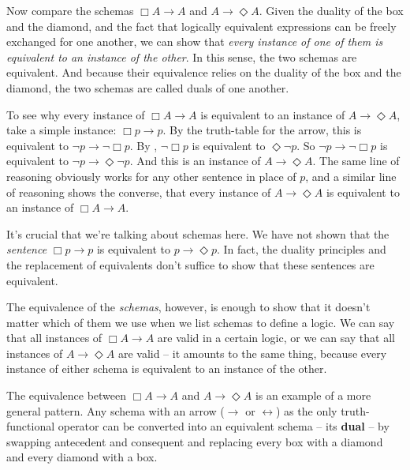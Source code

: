 
Now compare the schemas $\Box A \to A$ and $A \to \Diamond A$. Given the duality
of the box and the diamond, and the fact that logically equivalent expressions
can be freely exchanged for one another, we can show that \emph{every instance
  of one of them is equivalent to an instance of the other}. In this sense, the
two schemas are equivalent. And because their equivalence relies on the duality
of the box and the diamond, the two schemas are called duals of one another.


To see why every instance of $\Box A \to A$ is equivalent to an instance of
$A \to \Diamond A$, take a simple instance: $\Box p \to p$. By the truth-table
for the arrow, this is equivalent to $\neg p \to \neg \Box p$. By ,
$\neg \Box p$ is equivalent to $\Diamond \neg p$. So $\neg p \to \neg \Box p$ is
equivalent to $\neg p \to \Diamond \neg p$. And this is an instance of
$A \to \Diamond A$. The same line of reasoning obviously works for any other
sentence in place of $p$, and a similar line of reasoning shows the converse,
that every instance of $A \to \Diamond A$ is equivalent to an instance of
$\Box A \to A$.


It's crucial that we're talking about schemas here. We have not shown that the
\emph{sentence} $\Box p \to p$ is equivalent to $p \to \Diamond p$. In fact, the
duality principles and the replacement of equivalents don't suffice to show that
these sentences are equivalent.


The equivalence of the \emph{schemas}, however, is enough to show that it
doesn't matter which of them we use when we list schemas to define a logic. We
can say that all instances of $\Box A \to A$ are valid in a certain logic, or we
can say that all instances of $A \to \Diamond A$ are valid -- it amounts to the
same thing, because every instance of either schema is equivalent to an instance
of the other.


The equivalence between $\Box A \to A$ and $A \to \Diamond A$ is an example of
a more general pattern. Any schema with an arrow ($\to$ or $\leftrightarrow$) as
the only truth-functional operator can be converted into an equivalent schema --
its \textbf{dual} -- by swapping antecedent and consequent and replacing every
box with a diamond and every diamond with a box. 

